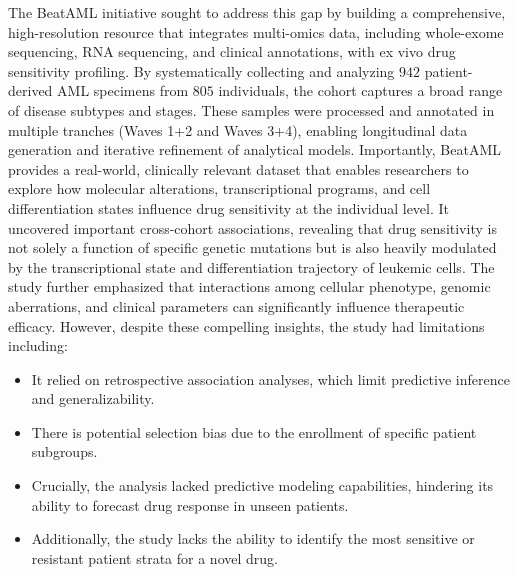 \documentclass[pdflatex,sn-mathphys-num]{sn-jnl}%
\theoremstyle{thmstyleone}%
\theoremstyle{thmstyletwo}%
\theoremstyle{thmstylethree}%
\begin{document}
The BeatAML initiative \cite{bottomly2022integrative} sought to address this gap by building a comprehensive, high-resolution resource that integrates multi-omics data, including whole-exome sequencing, RNA sequencing, and clinical annotations, with ex vivo drug sensitivity profiling. By systematically collecting and analyzing $942$ patient-derived AML specimens from $805$ individuals, the cohort captures a broad range of disease subtypes and stages. These samples were processed and annotated in multiple tranches (Waves 1+2 and Waves 3+4), enabling longitudinal data generation and iterative refinement of analytical models. Importantly, BeatAML provides a real-world, clinically relevant dataset that enables researchers to explore how molecular alterations, transcriptional programs, and cell differentiation states influence drug sensitivity at the individual level. It uncovered important cross-cohort associations, revealing that drug sensitivity is not solely a function of specific genetic mutations but is also heavily modulated by the transcriptional state and differentiation trajectory of leukemic cells. The study further emphasized that interactions among cellular phenotype, genomic aberrations, and clinical parameters can significantly influence therapeutic efficacy.
However, despite these compelling insights, the study \cite{bottomly2022integrative} had limitations including:
\begin{itemize}
    \item It relied on retrospective association analyses, which limit predictive inference and generalizability.
    \item There is potential selection bias due to the enrollment of specific patient subgroups.
    \item Crucially, the analysis lacked predictive modeling capabilities, hindering its ability to forecast drug response in unseen patients.
    \item Additionally, the study lacks the ability to identify the most sensitive or resistant patient strata for a novel drug.
\end{itemize}
\end{document}
